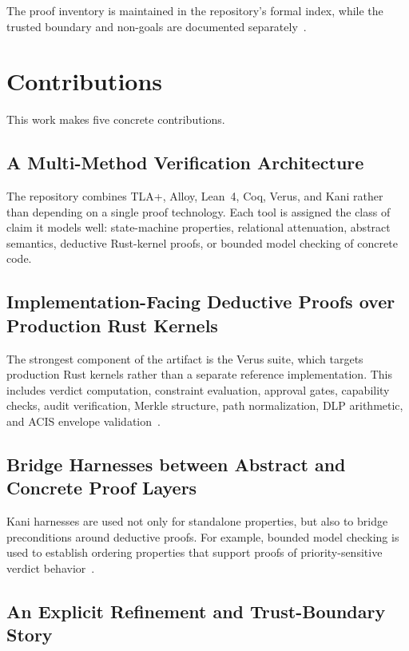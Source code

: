 \documentclass[11pt]{article}
\begin{document}
The proof inventory is maintained in the repository's formal index, while the
trusted boundary and non-goals are documented separately~\cite{vellavetoFormalInventory,vellavetoTCB,vellavetoFormalScope}.

\section{Contributions}

This work makes five concrete contributions.

\subsection{A Multi-Method Verification Architecture}

The repository combines TLA+, Alloy, Lean~4, Coq, Verus, and Kani rather than
depending on a single proof technology. Each tool is assigned the class of
claim it models well: state-machine properties, relational attenuation,
abstract semantics, deductive Rust-kernel proofs, or bounded model checking of
concrete code.

\subsection{Implementation-Facing Deductive Proofs over Production Rust Kernels}

The strongest component of the artifact is the Verus suite, which targets
production Rust kernels rather than a separate reference implementation. This
includes verdict computation, constraint evaluation, approval gates, capability
checks, audit verification, Merkle structure, path normalization, DLP
arithmetic, and ACIS envelope validation~\cite{verus,vellavetoFormalInventory}.

\subsection{Bridge Harnesses between Abstract and Concrete Proof Layers}

Kani harnesses are used not only for standalone properties, but also to bridge
preconditions around deductive proofs. For example, bounded model checking is
used to establish ordering properties that support proofs of priority-sensitive
verdict behavior~\cite{kani,vellavetoFormalInventory}.

\subsection{An Explicit Refinement and Trust-Boundary Story}
\end{document}
